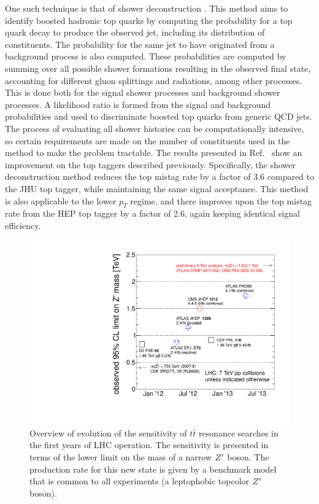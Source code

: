 One such technique is that of shower deconstruction \cite{Soper:2010xk}.  
This method aims to identify boosted hadronic top quarks by computing the 
probability for a top quark decay to produce the observed jet, including its 
distribution of constituents.  The probability for the same jet to have 
originated from a background process is also computed.  These probabilities 
are computed by summing over all possible shower formations resulting in the 
observed final state, accounting for different gluon splittings and 
radiations, among other processes. This is done both for the signal shower 
processes and background shower processes. A likelihood ratio is formed 
from the signal and background probabilities and used to discriminate 
boosted top quarks from generic QCD jets.  The process of evaluating all 
shower histories can be computationally intensive, so certain requirements 
are made on the number of constituents used in the method to make the 
problem tractable.  The results presented in Ref.~\cite{Soper:2012pb} 
show an improvement on the top taggers described previously. Specifically, 
the shower deconstruction method reduces the top mistag rate by a factor 
of 3.6 compared to the JHU top tagger, while maintaining the same signal 
acceptance.  This method is also applicable to the lower $p_T$ regime, 
and there improves upon the top mistag rate from the HEP top tagger by a 
factor of 2.6, again keeping identical signal efficiency.

\begin{figure}[htpb!]
\begin{center}
\includegraphics[width=0.6\linewidth]{summary_resonance_searches}
\end{center}
\caption{Overview of evolution of the sensitivity of $t\bar{t}$ resonance searches in the first years of LHC operation. The sensitivity is presented in terms of the lower limit on the mass of a narrow $Z'$ boson. The production rate for this new state is given by a benchmark model that is common to all experiments (a leptophobic topcolor $Z'{}$ boson).}
\label{fig:summary_searches}
\end{figure}


